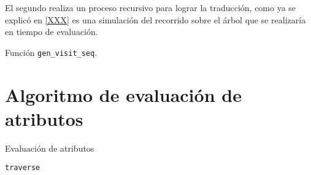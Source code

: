 El segundo realiza un proceso recursivo para lograr la traducción, como ya se explicó en \ref{XXX} es una simulación del recorrido sobre el árbol que se realizaría en tiempo de evaluación.

\begin{algorithm}[H]

\caption{Función \texttt{gen\_visit\_seq}.}
\end{algorithm}


\section{Algoritmo de evaluación de atributos}

\begin{algorithm}[H]

\caption{Evaluación de atributos}
\end{algorithm}

\begin{algorithm}[H]

\caption{\texttt{traverse}}
\end{algorithm}